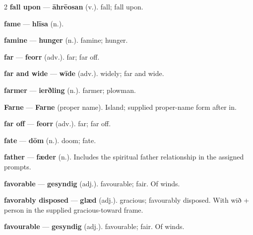 \begin{multicols}{2}
\textbf{fall upon} — \textbf{āhrēosan} (v.). fall; fall upon.\par
\textbf{fame} — \textbf{hlīsa} (n.).\par
\textbf{famine} — \textbf{hunger} (n.). famine; hunger.\par
\textbf{far} — \textbf{feorr} (adv.). far; far off.\par
\textbf{far and wide} — \textbf{wīde} (adv.). widely; far and wide.\par
\textbf{farmer} — \textbf{ierðling} (n.). farmer; plowman.\par
\textbf{Farne} — \textbf{Farne} (proper name). Island; supplied proper-name form after in.\par
\textbf{far off} — \textbf{feorr} (adv.). far; far off.\par
\textbf{fate} — \textbf{dōm} (n.). doom; fate.\par
\textbf{father} — \textbf{fæder} (n.). Includes the spiritual father relationship in the assigned prompts.\par
\textbf{favorable} — \textbf{gesyndig} (adj.). favourable; fair. Of winds.\par
\textbf{favorably disposed} — \textbf{glæd} (adj.). gracious; favourably disposed. With wið + person in the supplied gracious-toward frame.\par
\textbf{favourable} — \textbf{gesyndig} (adj.). favourable; fair. Of winds.\par

\end{multicols}
